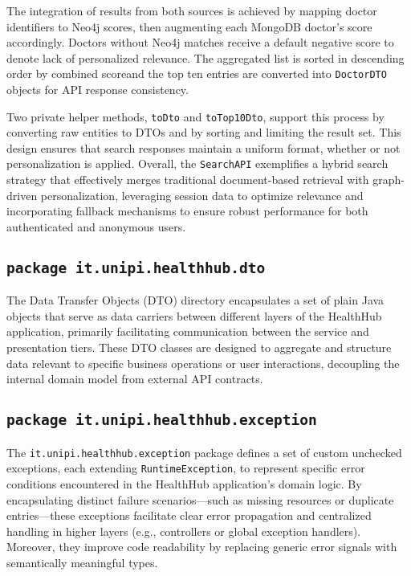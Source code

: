 The integration of results from both sources is achieved by mapping doctor identifiers to Neo4j scores, then augmenting each MongoDB doctor's score accordingly. Doctors without Neo4j matches receive a default negative score to denote lack of personalized relevance. The aggregated list is sorted in descending order by combined scoreand the top ten entries are converted into \texttt{DoctorDTO} objects for API response consistency.

Two private helper methods, \texttt{toDto} and \texttt{toTop10Dto}, support this process by converting raw entities to DTOs and by sorting and limiting the result set. This design ensures that search responses maintain a uniform format, whether or not personalization is applied. Overall, the \texttt{SearchAPI} exemplifies a hybrid search strategy that effectively merges traditional document-based retrieval with graph-driven personalization, leveraging session data to optimize relevance and incorporating fallback mechanisms to ensure robust performance for both authenticated and anonymous users.

\subsection{\texttt{package it.unipi.healthhub.dto}}
The Data Transfer Objects (DTO) directory encapsulates a set of plain Java objects that serve as data carriers between different layers of the HealthHub application, primarily facilitating communication between the service and presentation tiers. These DTO classes are designed to aggregate and structure data relevant to specific business operations or user interactions, decoupling the internal domain model from external API contracts.

\subsection{\texttt{package it.unipi.healthhub.exception}}
The \texttt{it.unipi.healthhub.exception} package defines a set of custom unchecked exceptions, each extending \texttt{RuntimeException}, to represent specific error conditions encountered in the HealthHub application’s domain logic. By encapsulating distinct failure scenarios—such as missing resources or duplicate entries—these exceptions facilitate clear error propagation and centralized handling in higher layers (e.g., controllers or global exception handlers). Moreover, they improve code readability by replacing generic error signals with semantically meaningful types.

